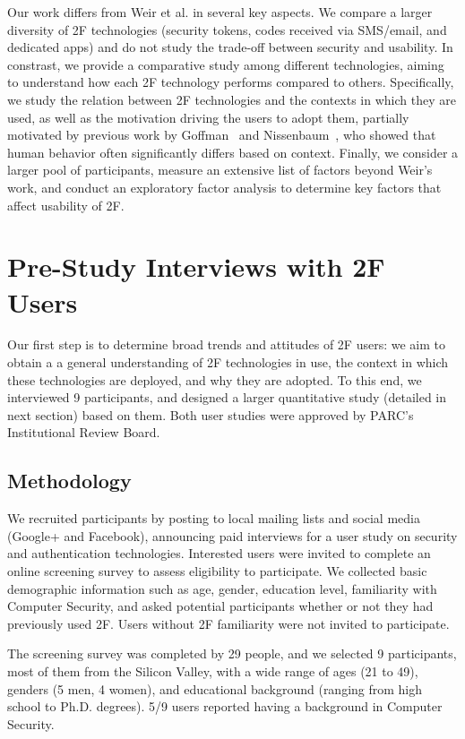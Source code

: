 \documentclass[conference]{IEEEtran}
\begin{document}
Our work differs from Weir et al. in several key aspects. We compare a larger diversity of 2F technologies (security tokens, codes received via SMS/email, and dedicated apps) and do not study the trade-off between security and usability. In constrast, we provide a comparative study among different technologies, aiming to understand how each 2F technology performs compared to others. Specifically, we study the relation between 2F technologies and the contexts in which they are used, as well as the motivation driving the users to adopt them, partially motivated by previous work by Goffman~\cite{goffman1959presentation} and Nissenbaum~\cite{nissenbaum2004privacy}, who showed that human behavior often significantly differs based on context. 
Finally, we consider a larger pool of participants, measure an extensive list of factors beyond Weir's work, and conduct an exploratory factor analysis to determine key factors that affect usability of 2F. 


\section{Pre-Study Interviews with 2F Users}
Our first step is to determine broad trends and attitudes of 2F users: we aim to obtain a 
a general understanding of 2F technologies in use, the context in which these technologies are deployed, and why they are adopted. To this end, we interviewed 9 participants, and designed a larger quantitative study (detailed in next section) based on them.
Both user studies were approved by PARC's Institutional Review Board.

\subsection{Methodology}

We recruited participants by posting to local mailing lists
and social media (Google+ and Facebook), announcing paid interviews 
for a user study on security and authentication technologies.
Interested users were invited to complete an online screening survey to assess eligibility to participate. We collected basic demographic information such as age, gender, 
education level, familiarity with Computer Security, and asked potential participants whether or not they had previously used 2F. Users without 2F familiarity were not invited to participate. 

The screening survey was completed by 29 people, and we selected 9 participants, most of them from the Silicon Valley, with a wide range of ages (21 to 49), genders (5 men, 4 women), and educational background (ranging from high school to Ph.D. degrees). 5/9 users reported having a background in Computer Security.
\end{document}
